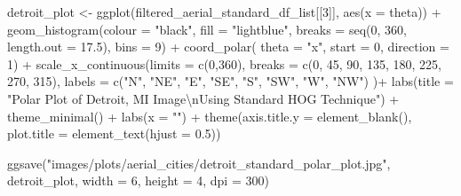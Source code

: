 \documentclass[
  letterpaper,
  DIV=11,
  numbers=noendperiod]{scrreprt}
\newenvironment{Shaded}{\begin{snugshade}}{\end{snugshade}}
\newcommand{\AttributeTok}[1]{\textcolor[rgb]{0.40,0.45,0.13}{#1}}
\newcommand{\DecValTok}[1]{\textcolor[rgb]{0.68,0.00,0.00}{#1}}
\newcommand{\FloatTok}[1]{\textcolor[rgb]{0.68,0.00,0.00}{#1}}
\newcommand{\FunctionTok}[1]{\textcolor[rgb]{0.28,0.35,0.67}{#1}}
\newcommand{\NormalTok}[1]{\textcolor[rgb]{0.00,0.23,0.31}{#1}}
\newcommand{\OtherTok}[1]{\textcolor[rgb]{0.00,0.23,0.31}{#1}}
\newcommand{\SpecialCharTok}[1]{\textcolor[rgb]{0.37,0.37,0.37}{#1}}
\newcommand{\StringTok}[1]{\textcolor[rgb]{0.13,0.47,0.30}{#1}}
\begin{document}
\begin{Shaded}
\begin{Highlighting}[]
\NormalTok{detroit\_plot }\OtherTok{\textless{}{-}}
  \FunctionTok{ggplot}\NormalTok{(filtered\_aerial\_standard\_df\_list[[}\DecValTok{3}\NormalTok{]], }
         \FunctionTok{aes}\NormalTok{(}\AttributeTok{x =}\NormalTok{ theta)) }\SpecialCharTok{+}
  \FunctionTok{geom\_histogram}\NormalTok{(}\AttributeTok{colour =} \StringTok{"black"}\NormalTok{, }
                 \AttributeTok{fill =} \StringTok{"lightblue"}\NormalTok{, }
                 \AttributeTok{breaks =} \FunctionTok{seq}\NormalTok{(}\DecValTok{0}\NormalTok{, }\DecValTok{360}\NormalTok{, }\AttributeTok{length.out =} \FloatTok{17.5}\NormalTok{),}
                 \AttributeTok{bins =} \DecValTok{9}\NormalTok{) }\SpecialCharTok{+}
  \FunctionTok{coord\_polar}\NormalTok{(}
    \AttributeTok{theta =} \StringTok{"x"}\NormalTok{, }
    \AttributeTok{start =} \DecValTok{0}\NormalTok{, }
    \AttributeTok{direction =} \DecValTok{1}\NormalTok{) }\SpecialCharTok{+}
  \FunctionTok{scale\_x\_continuous}\NormalTok{(}\AttributeTok{limits =} \FunctionTok{c}\NormalTok{(}\DecValTok{0}\NormalTok{,}\DecValTok{360}\NormalTok{),}
    \AttributeTok{breaks =} \FunctionTok{c}\NormalTok{(}\DecValTok{0}\NormalTok{, }\DecValTok{45}\NormalTok{, }\DecValTok{90}\NormalTok{, }\DecValTok{135}\NormalTok{, }\DecValTok{180}\NormalTok{, }\DecValTok{225}\NormalTok{, }\DecValTok{270}\NormalTok{, }\DecValTok{315}\NormalTok{), }
    \AttributeTok{labels =} \FunctionTok{c}\NormalTok{(}\StringTok{"N"}\NormalTok{, }\StringTok{"NE"}\NormalTok{, }\StringTok{"E"}\NormalTok{, }\StringTok{"SE"}\NormalTok{, }\StringTok{"S"}\NormalTok{, }\StringTok{"SW"}\NormalTok{, }\StringTok{"W"}\NormalTok{, }\StringTok{"NW"}\NormalTok{)}
\NormalTok{  )}\SpecialCharTok{+}
  \FunctionTok{labs}\NormalTok{(}\AttributeTok{title =} \StringTok{"Polar Plot of Detroit, MI Image}\SpecialCharTok{\textbackslash{}n}\StringTok{Using Standard HOG Technique"}\NormalTok{) }\SpecialCharTok{+}
  \FunctionTok{theme\_minimal}\NormalTok{() }\SpecialCharTok{+}
  \FunctionTok{labs}\NormalTok{(}\AttributeTok{x =} \StringTok{""}\NormalTok{) }\SpecialCharTok{+}
  \FunctionTok{theme}\NormalTok{(}\AttributeTok{axis.title.y =} \FunctionTok{element\_blank}\NormalTok{(),}
        \AttributeTok{plot.title =} \FunctionTok{element\_text}\NormalTok{(}\AttributeTok{hjust =} \FloatTok{0.5}\NormalTok{))}

\FunctionTok{ggsave}\NormalTok{(}\StringTok{"images/plots/aerial\_cities/detroit\_standard\_polar\_plot.jpg"}\NormalTok{, detroit\_plot, }\AttributeTok{width =} \DecValTok{6}\NormalTok{, }\AttributeTok{height =} \DecValTok{4}\NormalTok{, }\AttributeTok{dpi =} \DecValTok{300}\NormalTok{)}
\end{Highlighting}
\end{Shaded}
\end{document}
